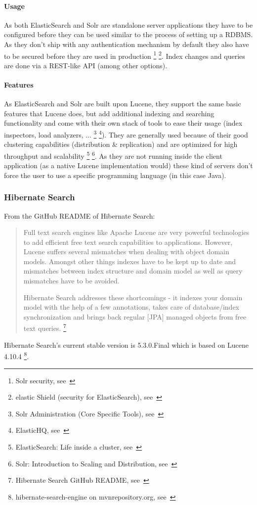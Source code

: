 \paragraph{Usage}
As both ElasticSearch and Solr are standalone server applications they have to be configured before they can be used similar to the process of setting up a RDBMS. As they don't ship with any authentication mechanism by default they also have to be secured before they are used in production \footnote{Solr security, see~\cite{solr_security}} \footnote{elastic Shield (security for ElasticSearch), see~\cite{elasticsearch_security}}. Index changes and queries are done via a REST-like API (among other options).

\paragraph{Features}
As ElasticSearch and Solr are built upon Lucene, they support the same basic features that Lucene does, but add additional indexing and searching functionality and come with their own stack of tools to ease their usage (index inspectors, load analyzers, ... \footnote{Solr Administration (Core Specific Tools), see~\cite{solr_admin}} \footnote{ElasticHQ, see~\cite{elasticsearch_admin}}). They are generally used because of their good clustering capabilities (distribution \& replication) and are optimized for high throughput and scalability \footnote{ElasticSearch: Life inside a cluster, see~\cite{elasticsearch_clustering}} \footnote{Solr: Introduction to Scaling and Distribution, see~\cite{solr_clustering}}. As they are not running inside the client application (as a native Lucene implementation would) these kind of servers don't force the user to use a specific programming language (in this case Java).

\pagebreak

\subsubsection{Hibernate Search}

From the GitHub README of Hibernate Search:
\begin{quote}
Full text search engines like Apache Lucene are very powerful technologies to add efficient free text search capabilities to applications. However, Lucene suffers several mismatches when dealing with object domain models. Amongst other things indexes have to be kept up to date and mismatches between index structure and domain model as well as query mismatches have to be avoided.

Hibernate Search addresses these shortcomings - it indexes your domain model with the help of a few annotations, takes care of database/index synchronization and brings back regular [JPA] managed objects from free text queries. \footnote{Hibernate Search GitHub README, see~\cite{hsearch_source_code_git}}
\end{quote}
\noindent
Hibernate Search's current stable version is 5.3.0.Final which is based on Lucene 4.10.4 \footnote{hibernate-search-engine on mvnrepository.org, see~\cite{hibernate_search_engine_mvnrepository}}.


